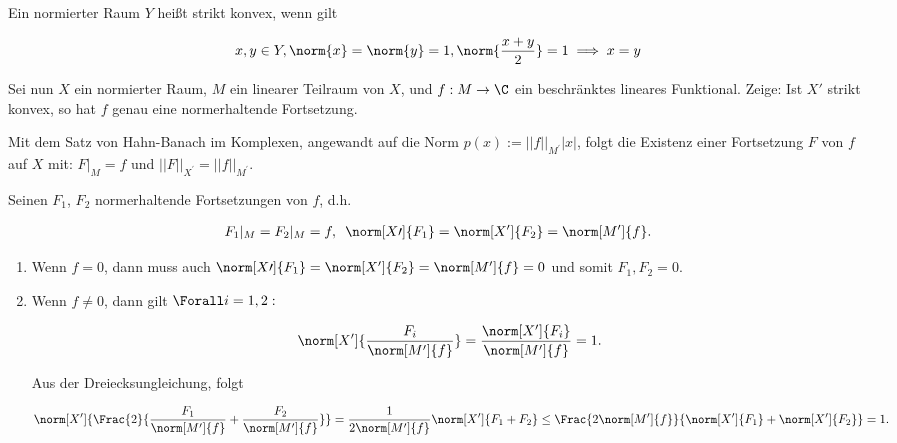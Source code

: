 \begin{exercise}

Ein normierter Raum $Y$ heißt strikt konvex, wenn gilt

\begin{align*}
  x, y \in Y,
  \norm{x} = \norm{y} = 1,
  \norm{\frac{x+y}{2}} = 1
  \implies
  x = y
\end{align*}

Sei nun $X$ ein normierter Raum, $M$ ein linearer Teilraum von $X$, und $f: M \to \C$ ein beschränktes lineares Funktional.
Zeige:
Ist $X\prime$ strikt konvex, so hat $f$ genau eine normerhaltende Fortsetzung.

\end{exercise}

\begin{solution}
Mit dem Satz von Hahn-Banach im Komplexen, angewandt auf die Norm $p(x) := ||f||_{M^{\prime}}|x|$,
folgt die Existenz einer Fortsetzung $F$ von $f$ auf $X$ mit: $F|_M = f$ und $||F||_{X^{\prime}} = ||f||_{M^{\prime}}$.

Seinen $F_1$, $F_2$ normerhaltende Fortsetzungen von $f$, d.h.

\begin{align*}
  F_1|_M = F_2|_M = f,
  \enspace
  \norm[X\prime]{F_1} = \norm[X^\prime]{F_2} = \norm[M^\prime]{f}.
\end{align*}

\begin{enumerate}[label = Fall \arabic*:]

  \item
  Wenn $f = 0$, dann muss auch $\norm[X\prime]{F_1} = \norm[X^\prime]{F_2} = \norm[M^\prime]{f} = 0$ und somit $F_1, F_2 = 0$.

  \item
  Wenn $f \neq 0$, dann gilt $\Forall i = 1, 2:$

  \begin{align*}
    \norm[X^\prime]{\frac{F_i}{\norm[M^\prime]{f}}}
    =
    \frac{\norm[X^\prime]{F_i}}{\norm[M^\prime]{f}} = 1.
  \end{align*}

  Aus der Dreiecksungleichung, folgt

  \begin{align*}
    \norm[X^\prime]
    {
      \Frac{2}
      {
        \frac{F_1}{\norm[M^\prime]{f}} +
        \frac{F_2}{\norm[M^\prime]{f}}
      }
    }
    =
    \frac{1}{2 \norm[M^\prime]{f}} \norm[X^\prime]{F_1 + F_2}
    \leq
    \Frac{2 \norm[M^\prime]{f}}
    {
      \norm[X^\prime]{F_1} +
      \norm[X^\prime]{F_2}
    }
    = 1.
  \end{align*}


\end{enumerate}
\end{solution}
